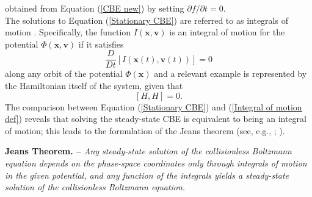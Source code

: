\documentclass[12pt,twoside,openany]{book}
\begin{document}
obtained from Equation (\ref{CBE new}) by setting $\partial f/\partial t=0$.\\The solutions to Equation (\ref{Stationary CBE}) are referred to as integrals of motion \parencite{Ciotti_book}. Specifically, the function $I(\mathbf{x},\mathbf{v})$ is an integral of motion for the potential $\Phi(\mathbf{x},\mathbf{v})$ if it satisfies
\begin{equation}\label{Integral of motion def}
    \frac{D}{Dt}[I(\mathbf{x}(t),\mathbf{v}(t))]=0
\end{equation}
along any orbit of the potential $\Phi(\mathbf{x})$ and a relevant example is represented by the Hamiltonian itself of the system, given that
\begin{equation}
\label{H as integral of motion}
 [H,H]=0.
\end{equation}
The comparison between Equation (\ref{Stationary CBE}) and (\ref{Integral of motion def}) reveals that solving the steady-state CBE is equivalent to being an integral of motion; this leads to the formulation of the Jeans theorem (see, e.g., \citealt{Lynden-Bell_1962}; \citealt{Binney_book}).
\medskip

\noindent\textbf{Jeans Theorem. --}
\emph{Any steady-state solution of the collisionless Boltzmann equation depends on
the phase-space coordinates only through integrals of motion in the given potential, and any function of the integrals yields a steady-state solution of the collisionless Boltzmann
equation.}
\medskip
\end{document}
